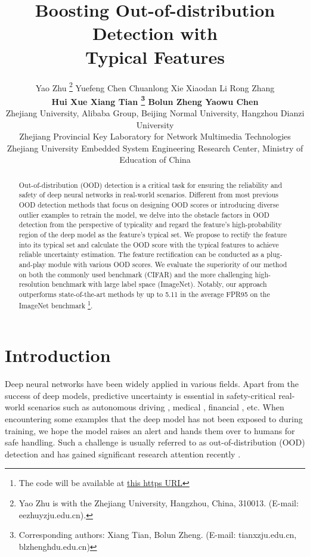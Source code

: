 \documentclass{article}
\title{Boosting Out-of-distribution Detection with\\ Typical Features}
\author{Yao Zhu \thanks{Yao Zhu is with the Zhejiang University, Hangzhou, China, 310013. (E-mail: eezhuyzju.edu.cn).} \quad Yuefeng Chen \quad Chuanlong Xie \quad Xiaodan Li \quad Rong Zhang \\ 
  \textbf{\quad Hui Xue \quad Xiang Tian \thanks{Corresponding authors: Xiang Tian, Bolun Zheng. (E-mail: tianxzju.edu.cn, blzhenghdu.edu.cn)} \quad Bolun Zheng \quad Yaowu Chen} \\
  Zhejiang University, Alibaba Group, Beijing Normal University, Hangzhou Dianzi University\\ Zhejiang Provincial Key Laboratory for Network Multimedia Technologies \\
   Zhejiang University Embedded System Engineering Research Center, Ministry of Education of China
}
\begin{document}
\maketitle


\begin{abstract}
Out-of-distribution (OOD) detection is a critical task for ensuring the reliability and safety of deep neural networks in real-world scenarios.
Different from most previous OOD detection methods that focus on designing OOD scores or introducing diverse outlier examples to retrain the model, we delve into the obstacle factors in OOD detection from the perspective of typicality and regard the feature's high-probability region of the deep model as the feature's typical set.
We propose to rectify the feature into its typical set and calculate the OOD score with the typical features to achieve reliable uncertainty estimation.
The feature rectification can be conducted as a {plug-and-play} module with various OOD scores.
We evaluate the superiority of our method on both the commonly used benchmark (CIFAR) and the more challenging high-resolution benchmark with large label space (ImageNet). Notably, our approach outperforms state-of-the-art methods by up to 5.11 in the average FPR95 on the ImageNet benchmark \footnote{The code will be available at \href{https://github.com/alibaba/easyrobust}{this https URL}}.  
\end{abstract}



\section{Introduction} 
Deep neural networks have been widely applied in various fields. Apart from the success of deep models,  predictive uncertainty is essential in safety-critical real-world scenarios such as autonomous driving \cite{geiger2012wedrive,huang2020surveydrive}, medical \cite{litjens2017surveymedical}, financial \cite{ozbayoglu2020deepfinancial}, etc. When encountering some examples that the deep model has not been exposed to during training, we hope the model raises an alert and hands them over to humans for safe handling. Such a challenge is usually referred to as out-of-distribution (OOD) detection and has gained significant research attention recently \cite{liu2020energy,hendrycks17baseline,ODIN,sun2021react}.
\end{document}
